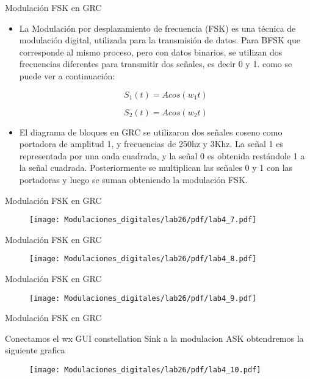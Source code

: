 \begin{frame}{Modulación FSK en GRC}

  \begin{itemize}
  \item {
La Modulación por desplazamiento de frecuencia (FSK) es una técnica de modulación digital, utilizada para la transmisión de datos. Para BFSK que corresponde al mismo proceso, pero con datos binarios, se utilizan dos frecuencias diferentes para transmitir dos señales, es decir 0 y 1. como se puede ver a continuación:

\begin{equation*}
S_{1}(t) = Acos(w_{1}t)
\end{equation*}

\begin{equation*}
S_{2}(t) = Acos(w_{2}t)
\end{equation*}

  }
  \item {
El diagrama de bloques en GRC se utilizaron dos señales coseno como portadora de amplitud 1, y frecuencias de 250hz y 3Khz. La señal 1 es representada por una onda cuadrada, y la señal 0 es obtenida restándole 1 a la señal cuadrada. Posteriormente se multiplican las señales 0 y 1 con las portadoras y luego se suman obteniendo la modulación FSK.
  }
  \end{itemize}
\end{frame}


\begin{frame}{Modulación FSK en GRC}
\vspace{-8mm}
\begin{figure}[H]
\centering
\texttt{[image: Modulaciones\_digitales/lab26/pdf/lab4\_7.pdf]}
\end{figure}
\end{frame}

\begin{frame}{Modulación FSK en GRC}
\begin{figure}[H]
\centering
\texttt{[image: Modulaciones\_digitales/lab26/pdf/lab4\_8.pdf]}
\end{figure}
\end{frame}

\begin{frame}{Modulación FSK en GRC}
\begin{figure}[H]
\centering
\texttt{[image: Modulaciones\_digitales/lab26/pdf/lab4\_9.pdf]}
\end{figure}
\end{frame}
\begin{frame}{Modulación FSK en GRC}
\begin{flushleft}
Conectamos el wx GUI constellation Sink a la modulacion ASK  obtendremos la siguiente grafica
\end{flushleft}
\vspace{-1.0cm}
\begin{figure}[H]
\centering
\texttt{[image: Modulaciones\_digitales/lab26/pdf/lab4\_10.pdf]}
\end{figure}
\end{frame}

